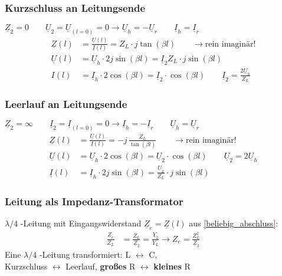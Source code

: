 \subsubsection{Kurzschluss an Leitungsende}
$ \underline{Z}_2 = 0 \qquad \underline{U}_2 = \underline{U}_{(l=0)} = 0 \rightarrow \underline{U}_h = - \underline{U}_r \qquad \underline{I}_h = \underline{I}_r $
\begin{align*}
	\underline{Z}(l)         & = \frac{\underline{U}(l)}{\underline{I}(l)} =  Z_L\cdot j\tan(\beta l)        \qquad \rightarrow \text{rein imaginär!}                      \\
	\underline{U}(l) & =  \underline{U}_h  \cdot 2j\sin(\beta l) = \underline{I}_2 Z_L \cdot j\sin(\beta l)\\
	I(l)         & = \underline{I}_h \cdot 2 \cos(\beta l) =\underline{I}_2 \cdot \cos(\beta l) \qquad \underline{I}_2 =\frac{2\underline{U}_h}{Z_L}
\end{align*}
\subsubsection{Leerlauf an Leitungsende}
$ \underline{Z}_2 = \infty \qquad \underline{I}_2 = \underline{I}_{(l=0)} = 0 \rightarrow \underline{I}_h = - \underline{I}_r \qquad \underline{U}_h = \underline{U}_r $
\begin{align*}
	\underline{Z}(l) & = \frac{\underline{U}(l)}{\underline{I}(l)}  = -j \,\frac{Z_L}{\tan(\beta l)}\qquad\rightarrow \text{rein imaginär!}                 \\
		\underline{U}(l) & = \underline{U}_h \cdot 2 \cos(\beta l) = \underline{U}_2 \cdot \cos(\beta l) \qquad \underline{U}_2 = 2\underline{U}_h\\
	\underline{I}(l)         & = \underline{I}_h\cdot 2j\sin(\beta l) = \frac{\underline{U}_2}{Z_L} \cdot  j \sin(\beta l)
\end{align*}

\subsubsection{Leitung als Impedanz-Transformator}
$\lambda / 4$ -Leitung mit Eingangswiderstand $ \underline{Z}_e = \underline{Z}(l) $ aus  \ref{beliebig_abschluss}:
\begin{align*}
	\frac{\underline{Z}_e}{Z_L} & = \frac{Z_L}{\underline{Z}_2} = \frac{\underline{Y}_2}{Y_L} \rightarrow Z_e = \frac{Z^2_L}{\underline{Z}_2}
\end{align*}
Eine $ \lambda / 4 $ -Leitung transformiert:
L $ \leftrightarrow $ C, \\Kurzschluss $ \leftrightarrow $ Leerlauf, \textbf{großes} R $ \leftrightarrow$ \textbf{kleines} R

